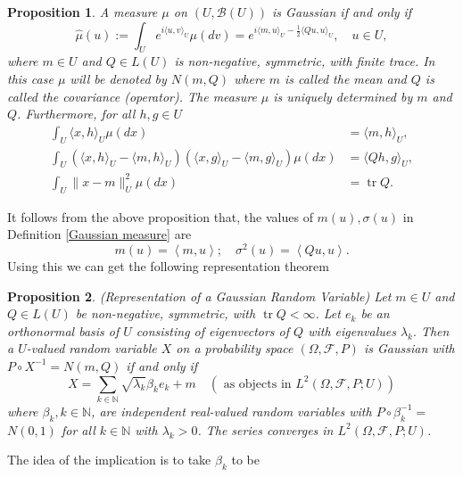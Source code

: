 \documentclass[12pt]{article}
\newcommand{\br}[1]{\left\langle#1\right\rangle}
\newtheorem{proposition}{Proposition}
\begin{document}
\begin{proposition}\label{exp}
	A measure $\mu$ on $(U, \mathcal{B}(U))$ is Gaussian if and only if
	$$
		\hat{\mu}(u):=\int_{U} e^{i\langle u, v\rangle_{U}} \mu(d v)=e^{i\langle m, u\rangle_{U}-\frac{1}{2}\langle Q u, u\rangle_{U}}, \quad u \in U,
	$$
	where $m \in U$ and $Q \in L(U)$ is non-negative, symmetric, with finite trace. In this case $\mu$ will be denoted by $N(m, Q)$ where $m$ is called the mean and $Q$ is called the covariance (operator). The measure $\mu$ is uniquely determined by $m$ and $Q$.
	Furthermore, for all $h, g \in U$
	\begin{align*}
		\int_U\langle x, h\rangle_{U} \mu(d x)                                                                                                  & =\langle m, h\rangle_{U},   \\
		\int_U\left(\langle x, h\rangle_{U}-\langle m, h\rangle_{U}\right)\left(\langle x, g\rangle_{U}-\langle m, g\rangle_{U}\right) \mu(d x) & =\langle Q h, g\rangle_{U}, \\
		\int_U\|x-m\|_{U}^2 \mu(d x)                                                                                                            & =\operatorname{tr} Q .
	\end{align*}
\end{proposition}
It follows from the above proposition that, the values of $m(u),\sigma(u)$ in Definition \ref{Gaussian measure} are
\begin{equation*}
	m(u)=\br{m,u};\quad \sigma^2(u)=\br{Qu,u}.
\end{equation*}
Using this we can get the following representation theorem
\begin{proposition}(Representation of a Gaussian Random Variable) Let $m \in U$ and $Q \in L(U)$ be non-negative, symmetric, with $\operatorname{tr} Q<\infty$. Let $e_{k}$ be an orthonormal basis of $U$ consisting of eigenvectors of $Q$ with eigenvalues $\lambda_{k}.$
	Then a $U$-valued random variable $X$ on a probability space $(\Omega, \mathcal{F}, P)$ is Gaussian with $P \circ X^{-1}=N(m, Q)$ if and only if
	$$
		X=\sum_{k \in \mathbb{N}} \sqrt{\lambda_{k}} \beta_{k} e_{k}+m \quad\left(\text { as objects in } L^2(\Omega, \mathcal{F}, P ; U)\right)
	$$
	where $\beta_{k}, k \in \mathbb{N}$, are independent real-valued random variables with $P \circ \beta_{k}^{-1}=$ $N(0,1)$ for all $k \in \mathbb{N}$ with $\lambda_{k}>0$. The series converges in $L^2(\Omega, \mathcal{F}, P ; U)$.
\end{proposition}
The idea of the implication is to take $\beta_k$ to be
\end{document}
